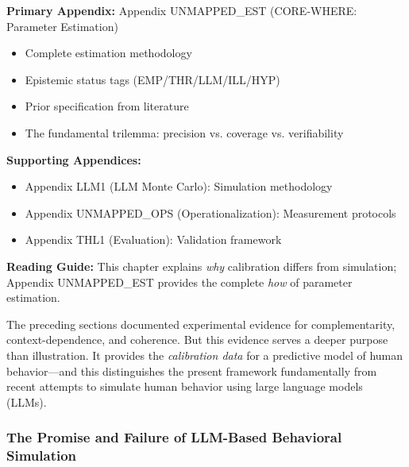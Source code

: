 \begin{tcolorbox}[colback=orange!5!white, colframe=orange!75!black,
    title=\textbf{Appendix References}]

\textbf{Primary Appendix:} Appendix UNMAPPED_EST (CORE-WHERE: Parameter Estimation)
\begin{itemize}[nosep]
    \item Complete estimation methodology
    \item Epistemic status tags (EMP/THR/LLM/ILL/HYP)
    \item Prior specification from literature
    \item The fundamental trilemma: precision vs. coverage vs. verifiability
\end{itemize}

\textbf{Supporting Appendices:}
\begin{itemize}[nosep]
    \item Appendix LLM1 (LLM Monte Carlo): Simulation methodology
    \item Appendix UNMAPPED_OPS (Operationalization): Measurement protocols
    \item Appendix THL1 (Evaluation): Validation framework
\end{itemize}

\textbf{Reading Guide:} This chapter explains \textit{why} calibration differs from simulation;
Appendix UNMAPPED_EST provides the complete \textit{how} of parameter estimation.

\end{tcolorbox}

The preceding sections documented experimental evidence for complementarity,
context-dependence, and coherence. But this evidence serves a deeper purpose
than illustration. It provides the \emph{calibration data} for a predictive
model of human behavior---and this distinguishes the present framework
fundamentally from recent attempts to simulate human behavior using large
language models (LLMs).


\subsubsection{The Promise and Failure of LLM-Based Behavioral Simulation}

